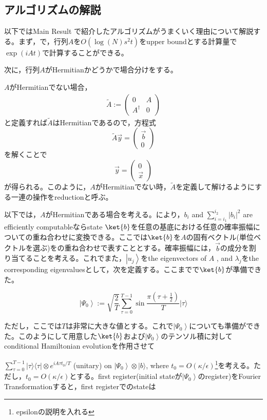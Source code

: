 \documentclass[b5paper,papersize,dvipdfmx,fleqn]{jsarticle}
\begin{document}
\subsection{アルゴリズムの解説}

以下ではMain Result で紹介したアルゴリズムがうまくいく理由について解説する。まず，\cite{Berry2007}で，行列$A$を$O(\log(N)s^2t)$をupper boundとする計算量で$\exp(iAt)$で計算することができる。

次に，行列$A$がHermitianかどうかで場合分けをする。

$A$がHermitianでない場合，
\begin{eqnarray}
  \tilde{A}:= \left(\begin{array}{cc}
0 & A \\
A^{\dagger} & 0
\end{array}\right)
\end{eqnarray}
と定義すれば$\tilde{A}$はHermitianであるので，方程式
$$
\tilde{A} \vec{y}=\left(\begin{array}{l}
\vec{b} \\
0
\end{array}\right)
$$
を解くことで
$$
\vec{y}=\left(\begin{array}{l}
0 \\
\vec{x}
\end{array}\right)
$$
が得られる。このように，$A$がHermitianでない時，$\tilde{A}$を定義して解けるようにする一連の操作をreductionと呼ぶ。

以下では，$A$がHermitianである場合を考える。\cite{Grover2002}により，$b_{i}$ and $\sum_{i=i_{1}}^{i_{2}}\left|b_{i}\right|^{2}$ are efficiently computableならstate $\ket{b}$を任意の基底における任意の確率振幅についての重ね合わせに変換できる。ここでは$\ket{b}$を$A$の固有ベクトル(単位ベクトルを選ぶ)をの重ね合わせで表すこととする。確率振幅には，$\vec{b}$の成分を割り当てることを考える。これでまた，$\left|u_{j}\right\rangle$をthe eigenvectors of $A$ , and $\lambda_{j}$をthe corresponding eigenvaluesとして，次を定義する。ここまでで$\ket{b}$が準備できた。

$$
\left|\Psi_{0}\right\rangle:=\sqrt{\frac{2}{T}} \sum_{\tau=0}^{T-1} \sin \frac{\pi\left(\tau+\frac{1}{2}\right)}{T}|\tau\rangle
$$

ただし，ここでは$T$は非常に大きな値とする。これで$
\left|\Psi_{0}\right\rangle$についても準備ができた。このようにして用意した$\ket{b}$および$\left|\Psi_{0}\right\rangle$のテンソル積に対してconditional Hamiltonian evolutionを作用させて

$\sum_{\tau=0}^{T-1}|\tau\rangle\langle\tau| \otimes e^{i A \tau t_{0} / T}$ (unitary) on $\left|\Psi_{0}\right\rangle \otimes|b\rangle$, where $t_{0}=O(\kappa / \epsilon)$\footnote{epsilonの説明を入れる}を考える。ただし，$t_{0}=O(\kappa / \epsilon)$とする。first register(initial stateが$\left|\Psi_{0}\right\rangle$のregister)をFourier Transformationすると，first registerでのstateは
\end{document}
